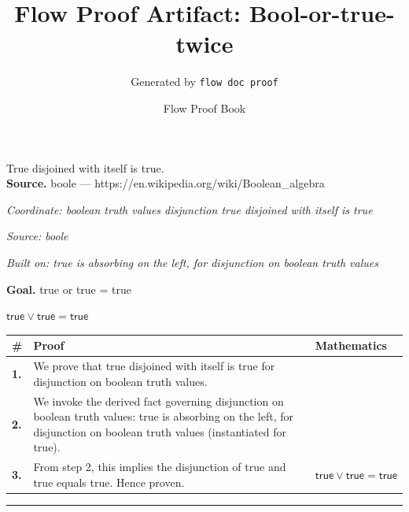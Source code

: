 \documentclass[11pt]{article}
\title{Flow Proof Artifact: Bool-or-true-twice}
\author{Generated by \texttt{flow doc proof}}
\date{Flow Proof Book}
\theoremstyle{definition}
\begin{document}
\maketitle
True disjoined with itself is true.\\[0.5em]
\textbf{Source.} boole — https://en.wikipedia.org/wiki/Boolean\_algebra\\[0.5em]
\bigskip
{}\par
\smallskip\noindent\textit{Coordinate: boolean truth values \cdot disjunction \cdot true disjoined with itself is true}\par
\smallskip\noindent\textit{Source: boole}\par
\smallskip\noindent\textit{Built on: true is absorbing on the left, for disjunction on boolean truth values}\par
\medskip
\noindent\textbf{Goal.} true or true = true\par
\noindent$\displaystyle \mathsf{true} \lor \mathsf{true} = \mathsf{true}$\par
\medskip
\noindent
\begin{tabular}{@{} >{\raggedright\arraybackslash}p{} >{\raggedright\arraybackslash}p{} >{\raggedleft\arraybackslash}p{} @{}}
\textbf{\#} & \textbf{Proof} & \textbf{Mathematics} \\
\midrule
\textbf{1.} & We prove that true disjoined with itself is true for disjunction on boolean truth values. & \\[0.45em]
\textbf{2.} & We invoke the derived fact governing disjunction on boolean truth values: true is absorbing on the left, for disjunction on boolean truth values (instantiated for true). & \\[0.45em]
\textbf{3.} & From step 2, this implies the disjunction of true and true equals true. Hence proven. & $\displaystyle \mathsf{true} \lor \mathsf{true} = \mathsf{true}$ \\[0.45em]
\bottomrule
\end{tabular}
\label{thm:Bool-disjunction-true_disjoined_with_itself_is_true}
\par\medskip\hrule
\end{document}
